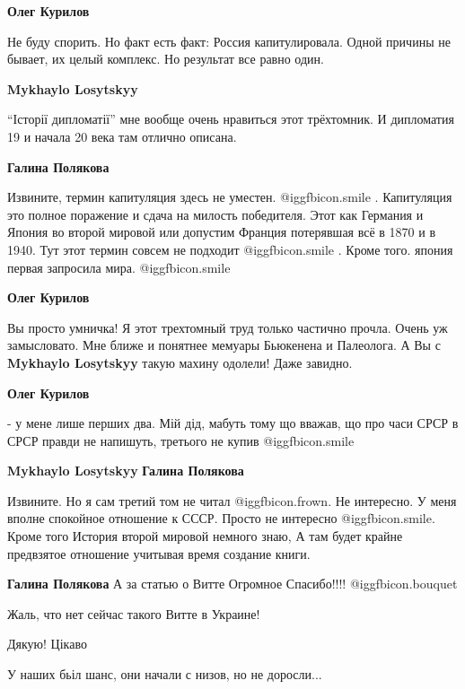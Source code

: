 \begin{itemize}
\begin{itemize}
\begin{itemize}
\textbf{Олег Курилов} 

Не буду спорить. Но факт есть факт: Россия капитулировала. Одной причины не
бывает, их целый комплекс. Но результат все равно один.

\textbf{Mykhaylo Losytskyy} 

\enquote{Історії дипломатії} мне вообще очень нравиться этот трёхтомник. И
дипломатия 19 и начала 20 века там отлично описана.

\textbf{Галина Полякова} 

Извините, термин капитуляция здесь не уместен.  @igg{fbicon.smile} . Капитуляция это полное
поражение и сдача на милость победителя. Этот как Германия и Япония во второй
мировой или допустим Франция потерявшая всё в 1870 и в 1940. Тут этот термин
совсем не подходит  @igg{fbicon.smile} . Кроме того. япония первая запросила мира.  @igg{fbicon.smile} 

\textbf{Олег Курилов} 

Вы просто умничка! Я этот трехтомный труд только частично прочла. Очень уж
замысловато. Мне ближе и понятнее мемуары Бьюкенена и Палеолога. А Вы с
\textbf{Mykhaylo Losytskyy} такую махину одолели! Даже завидно.

\textbf{Олег Курилов} 

- у мене лише перших два. Мій дід, мабуть тому що вважав, що про часи СРСР в
СРСР правди не напишуть, третього не купив  @igg{fbicon.smile} 

\textbf{Mykhaylo Losytskyy} \textbf{Галина Полякова} 

Извините. Но я сам третий том не читал  @igg{fbicon.frown}. Не интересно. У
меня вполне спокойное отношение к СССР. Просто не интересно
@igg{fbicon.smile}. Кроме того История второй мировой немного знаю, А там
будет крайне предвзятое отношение учитывая время создание книги.


\textbf{Галина Полякова} А за статью о Витте Огромное Спасибо!!!! @igg{fbicon.bouquet} 

\end{itemize} %

\end{itemize} %

Жаль, что нет сейчас такого Витте в Украине!

Дякую! Цікаво

У наших бьіл шанс, они начали с низов, но не доросли...


\end{itemize}

